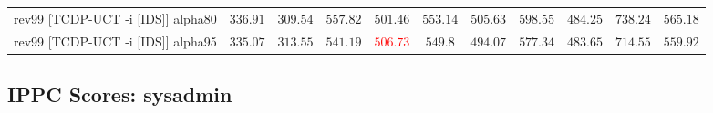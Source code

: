 \documentclass{article}
\begin{document}
\begin{tabular}{|l|r@{$\pm$}rr@{$\pm$}rr@{$\pm$}rr@{$\pm$}rr@{$\pm$}rr@{$\pm$}rr@{$\pm$}rr@{$\pm$}rr@{$\pm$}rr@{$\pm$}r|}
\\
rev99 [TCDP-UCT -i [IDS]] alpha80
& \multicolumn{2}{c}{\textbf{$336.91$}}
& \multicolumn{2}{c}{$309.54$}
& \multicolumn{2}{c}{$557.82$}
& \multicolumn{2}{c}{\textbf{$501.46$}}
& \multicolumn{2}{c}{$553.14$}
& \multicolumn{2}{c}{$505.63$}
& \multicolumn{2}{c}{$598.55$}
& \multicolumn{2}{c}{$484.25$}
& \multicolumn{2}{c}{\textbf{$738.24$}}
& \multicolumn{2}{c|}{$565.18$}
\\
rev99 [TCDP-UCT -i [IDS]] alpha95
& \multicolumn{2}{c}{\textbf{$335.07$}}
& \multicolumn{2}{c}{\textbf{$313.55$}}
& \multicolumn{2}{c}{$541.19$}
& \multicolumn{2}{c}{\textbf{\textcolor{red}{$506.73$}}}
& \multicolumn{2}{c}{$549.8$}
& \multicolumn{2}{c}{$494.07$}
& \multicolumn{2}{c}{$577.34$}
& \multicolumn{2}{c}{$483.65$}
& \multicolumn{2}{c}{$714.55$}
& \multicolumn{2}{c|}{$559.92$}
\\
\hline
\end{tabular}%

\bigskip

\subsection*{IPPC Scores: sysadmin}
\end{document}
